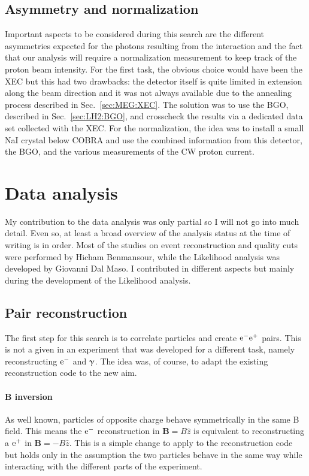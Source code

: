 \begin{refsection}
    \subsection{Asymmetry and normalization}
        Important aspects to be considered during this search are the different asymmetries expected for the photons resulting from the interaction and the fact that our analysis will require a normalization measurement to keep track of the proton beam intensity.
        For the first task, the obvious choice would have been the XEC but this had two drawbacks: the detector itself is quite limited in extension along the beam direction and it was not always available due to the annealing process described in Sec.~\ref{sec:MEG:XEC}.
        The solution was to use the BGO, described in Sec.~\ref{sec:LH2:BGO}, and crosscheck the results via a dedicated data set collected with the XEC.
        For the normalization, the idea was to install a small NaI crystal below COBRA and use the combined information from this detector, the BGO, and the various measurements of the CW proton current.

\section{Data analysis}
    My contribution to the data analysis was only partial so I will not go into much detail. 
    Even so, at least a broad overview of the analysis status at the time of writing is in order.
    Most of the studies on event reconstruction and quality cuts were performed by Hicham Benmansour, while the Likelihood analysis was developed by Giovanni Dal Maso. 
    I contributed in different aspects but mainly during the development of the Likelihood analysis.
    
    \subsection{Pair reconstruction}
        The first step for this search is to correlate particles and create $\text{e}^- \text{e}^+$ pairs. 
        This is not a given in an experiment that was developed for a different task, namely reconstructing $\text{e}^-$ and $\upgamma$. 
        The idea was, of course, to adapt the existing reconstruction code to the new aim.
        
        \paragraph{\textbf{B} inversion}
        As well known, particles of opposite charge behave symmetrically in the same B field.
        This means the $\text{e}^-$ reconstruction in $\textbf{B}=B\hat{z}$ is equivalent to reconstructing a $\text{e}^+$ in $\textbf{B}=-B\hat{z}$.
        This is a simple change to apply to the reconstruction code but holds only in the assumption the two particles behave in the same way while interacting with the different parts of the experiment.
        

\end{refsection}
